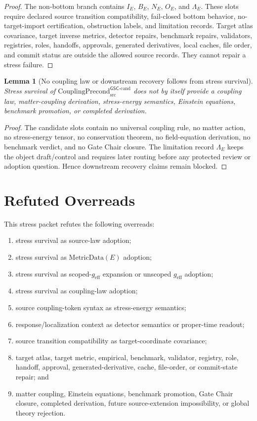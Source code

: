 \documentclass[11pt]{article}
\newcommand{\geff}{g_{\mathrm{eff}}}
\newcommand{\CouplingPrecond}{\mathrm{CouplingPrecond}^{\mathsf{GSC}\mbox{-}\mathrm{cand}}_{\mathrm{src}}}
\newtheorem{lemma}{Lemma}
\begin{document}
\begin{proof}
The non-bottom branch contains \(I_E\), \(B_E\), \(N_E\), \(O_E\), and
\(\Lambda_E\). These slots require declared source transition compatibility,
fail-closed bottom behavior, no-target-import certification, obstruction
labels, and limitation records. Target atlas covariance, target inverse
metrics, detector repairs, benchmark repairs, validators, registries, roles,
handoffs, approvals, generated derivatives, local caches, file order, and
commit status are outside the allowed source records. They cannot repair a
stress failure.
\end{proof}

\begin{lemma}[No coupling law or downstream recovery follows from stress survival]
Stress survival of \(\CouplingPrecond\) does not by itself provide a coupling
law, matter-coupling derivation, stress-energy semantics, Einstein equations,
benchmark promotion, or completed derivation.
\end{lemma}

\begin{proof}
The candidate slots contain no universal coupling rule, no matter action, no
stress-energy tensor, no conservation theorem, no field-equation derivation,
no benchmark verdict, and no Gate Chair closure. The limitation record
\(\Lambda_E\) keeps the object draft/control and requires later routing before
any protected review or adoption question. Hence downstream recovery claims
remain blocked.
\end{proof}

\section{Refuted Overreads}

This stress packet refutes the following overreads:
\begin{enumerate}[leftmargin=*]
  \item stress survival as source-law adoption;
  \item stress survival as \(\mathrm{MetricData}(E)\) adoption;
  \item stress survival as scoped-\(\geff\) expansion or unscoped
  \(\geff\) adoption;
  \item stress survival as coupling-law adoption;
  \item source coupling-token syntax as stress-energy semantics;
  \item response/localization context as detector semantics or proper-time
  readout;
  \item source transition compatibility as target-coordinate covariance;
  \item target atlas, target metric, empirical, benchmark, validator,
  registry, role, handoff, approval, generated-derivative, cache, file-order,
  or commit-state repair; and
  \item matter coupling, Einstein equations, benchmark promotion, Gate Chair
  closure, completed derivation, future source-extension impossibility, or
  global theory rejection.
\end{enumerate}
\end{document}
